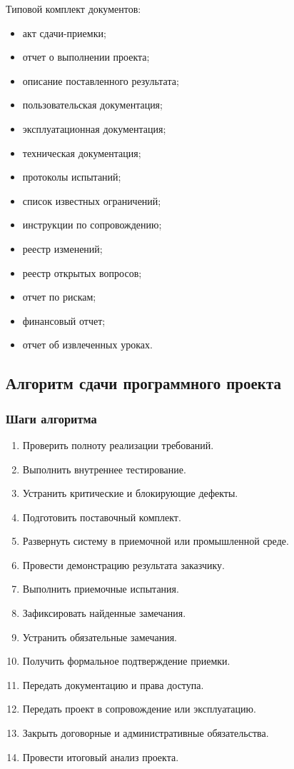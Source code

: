\documentclass[12pt,a4paper]{article}
\begin{document}
Типовой комплект документов:
\begin{itemize}
    \item акт сдачи-приемки;
    \item отчет о выполнении проекта;
    \item описание поставленного результата;
    \item пользовательская документация;
    \item эксплуатационная документация;
    \item техническая документация;
    \item протоколы испытаний;
    \item список известных ограничений;
    \item инструкции по сопровождению;
    \item реестр изменений;
    \item реестр открытых вопросов;
    \item отчет по рискам;
    \item финансовый отчет;
    \item отчет об извлеченных уроках.
\end{itemize}

\subsection{Алгоритм сдачи программного проекта}

\subsubsection*{Шаги алгоритма}

\begin{enumerate}
    \item Проверить полноту реализации требований.
    \item Выполнить внутреннее тестирование.
    \item Устранить критические и блокирующие дефекты.
    \item Подготовить поставочный комплект.
    \item Развернуть систему в приемочной или промышленной среде.
    \item Провести демонстрацию результата заказчику.
    \item Выполнить приемочные испытания.
    \item Зафиксировать найденные замечания.
    \item Устранить обязательные замечания.
    \item Получить формальное подтверждение приемки.
    \item Передать документацию и права доступа.
    \item Передать проект в сопровождение или эксплуатацию.
    \item Закрыть договорные и административные обязательства.
    \item Провести итоговый анализ проекта.
\end{enumerate}
\end{document}
